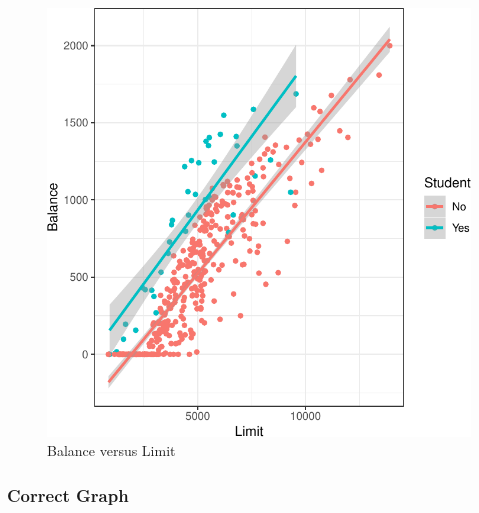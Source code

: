 \documentclass[
]{article}
\begin{document}
\begin{figure}

{\centering \includegraphics{SDM-CHAP24_files/figure-latex/GGDWDYE-1} 

}

\caption{Balance versus Limit}\label{fig:GGDWDYE}
\end{figure}

\hypertarget{correct-graph}{%
\subsubsection{Correct Graph}\label{correct-graph}}
\end{document}
